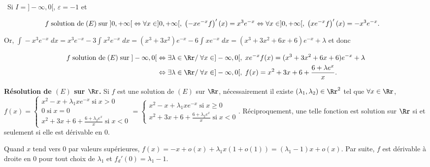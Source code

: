 {\begin{enumerate}
{\begin{center}
\fbox{
$\mathcal{S}_{]0,+\infty[}=\left\{x\mapsto x^2-x+\lambda xe^{-x},\;\lambda\in\Rr\right\}$.
}
\end{center}

\textbullet~Si $I=]-\infty,0[$, $\varepsilon=-1$ et 

\begin{align*}\ensuremath
f\;\text{solution de}\;(E)\;\text{sur}\;]0,+\infty[&\Leftrightarrow\forall x\in ]0,+\infty[,\;\left(-xe^{-x}f\right)'(x)=x^3e^{-x}
\Leftrightarrow\forall x\in ]0,+\infty[,\;\left(xe^{-x}f\right)'(x)=-x^3e^{-x}.
\end{align*}

Or, $\int_{}^{}-x^3e^{-x}\;dx=x^3e^{-x}-3\int_{}^{}x^2e^{-x}\;dx=(x^3+3x^2)e^{-x}-6\int_{}^{}xe^{-x}\;dx=(x^3+3x^2+6x+6)e^{-x}+\lambda$ et donc

\begin{align*}\ensuremath
f\;\text{solution de}\;(E)\;\text{sur}\;]-\infty,0[&\Leftrightarrow\exists\lambda\in\Rr/\;\forall x\in]-\infty,0[,\;xe^{-x}f(x)=(x^3+3x^2+6x+6)e^{-x}+\lambda\\
 &\Leftrightarrow\exists\lambda\in\Rr/\;\forall x\in]-\infty,0[,\;f(x)=x^2+3x+6+ \frac{6+\lambda e^x}{x}.
\end{align*}

\begin{center}
\fbox{
$\mathcal{S}_{]0,+\infty[}=\left\{x\mapsto x^2+3x+6+ \frac{6+\lambda e^x}{x},\;\lambda\in\Rr\right\}$.
}
\end{center}

\textbf{Résolution de $(E)$ sur $\Rr$.} Si $f$ est une solution de $(E)$ sur $\Rr$, nécessairement il existe $(\lambda_1,\lambda_2)\in\Rr^2$ tel que $\forall x\in\Rr$, $f(x)=\left\{
\begin{array}{l}
x^2-x+\lambda_1 xe^{-x}\;\text{si}\;x>0\\
0\;\text{si}\;x=0\\
x^2+3x+6+ \frac{6+\lambda_2 e^x}{x}\;\text{si}\;x<0
\end{array}
\right.=\left\{
\begin{array}{l}
x^2-x+\lambda_1 xe^{-x}\;\text{si}\;x\geqslant0\\
x^2+3x+6+ \frac{6+\lambda_2 e^x}{x}\;\text{si}\;x<0
\end{array}
\right.$. Réciproquement, une telle fonction est solution sur $\Rr$ si et seulement si elle est dérivable en $0$.

Quand $x$ tend vers $0$ par valeurs supérieures, $f(x)=-x+o(x)+\lambda_1 x(1+o(1))=(\lambda_1-1)x+o(x)$. Par suite, $f$ est dérivable à droite en $0$ pour tout choix de $\lambda_1$ et $f_d'(0)=\lambda_1-1$.

}
\end{enumerate}}
